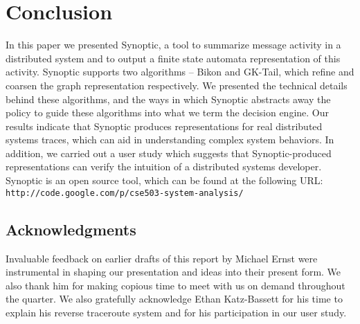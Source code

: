 \section{Conclusion}
\label{sec:conclusion}

In this paper we presented Synoptic, a tool to summarize message
activity in a distributed system and to output a finite state automata
representation of this activity. Synoptic supports two algorithms --
Bikon and GK-Tail, which refine and coarsen the graph representation
respectively. We presented the technical details behind these
algorithms, and the ways in which Synoptic abstracts away the policy
to guide these algorithms into what we term the decision engine.  Our
results indicate that Synoptic produces representations for real
distributed systems traces, which can aid in understanding complex
system behaviors. In addition, we carried out a user study which
suggests that Synoptic-produced representations can verify the
intuition of a distributed systems developer. Synoptic is an open
source tool, which can be found at the following URL:
\texttt{\footnotesize
  http://code.google.com/p/cse503-system-analysis/}

\subsection*{Acknowledgments}

Invaluable feedback on earlier drafts of this report by Michael Ernst
were instrumental in shaping our presentation and ideas into their
present form. We also thank him for making copious time to meet with
us on demand throughout the quarter. We also gratefully acknowledge
Ethan Katz-Bassett for his time to explain his reverse traceroute
system and for his participation in our user study.
